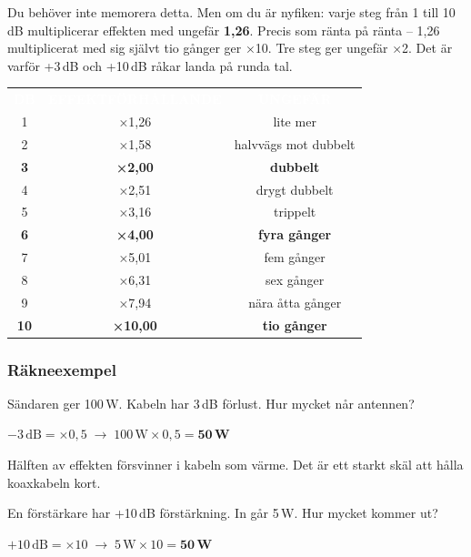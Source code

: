 \documentclass[a4paper,11pt,twoside]{book}
\newcommand{\emoji}[1]{{\emojifont #1}}
\newcommand{\tblhdr}[1]{\cellcolor{greydark}\textcolor{white}{\headingfont\bfseries\footnotesize\MakeUppercase{#1}}}
\begin{document}
\begin{examplebox}[title={\emoji{💡} Hela dB-tabellen -- för den nyfikne}]
Du behöver inte memorera detta. Men om du är nyfiken: varje steg från 1 till 10\,dB multiplicerar effekten med ungefär \textbf{1,26}. Precis som ränta på ränta -- 1,26 multiplicerat med sig självt tio gånger ger ×10. Tre steg ger ungefär ×2. Det är varför +3\,dB och +10\,dB råkar landa på runda tal.

\smallskip
\begin{center}
\begin{tabular}{ccc}
\rowcolor{greydark}
\tblhdr{dB} & \tblhdr{Effektförhållande} & \tblhdr{Ungefär} \\
1  & ×1,26 & lite mer \\
\rowcolor{greylight}
2  & ×1,58 & halvvägs mot dubbelt \\
\textbf{3}  & \textbf{×2,00} & \textbf{dubbelt} \\
\rowcolor{greylight}
4  & ×2,51 & drygt dubbelt \\
5  & ×3,16 & trippelt \\
\rowcolor{greylight}
\textbf{6}  & \textbf{×4,00} & \textbf{fyra gånger} \\
7  & ×5,01 & fem gånger \\
\rowcolor{greylight}
8  & ×6,31 & sex gånger \\
9  & ×7,94 & nära åtta gånger \\
\rowcolor{greylight}
\textbf{10} & \textbf{×10,00} & \textbf{tio gånger} \\
\end{tabular}
\end{center}
\end{examplebox}

\subsubsection*{Räkneexempel}

\begin{worked}[title={Räkneexempel 1.3.2-1 -- Kabelförlust}]
Sändaren ger 100\,W. Kabeln har 3\,dB förlust. Hur mycket når antennen?

$-3\,\text{dB} = \times 0{,}5 \;\rightarrow\; 100\,\text{W} \times 0{,}5 = \mathbf{50\,\text{W}}$

Hälften av effekten försvinner i kabeln som värme. Det är ett starkt skäl att hålla koaxkabeln kort.
\end{worked}

\begin{worked}[title={Räkneexempel 1.3.2-2 -- Förstärkare}]
En förstärkare har +10\,dB förstärkning. In går 5\,W. Hur mycket kommer ut?

$+10\,\text{dB} = \times 10 \;\rightarrow\; 5\,\text{W} \times 10 = \mathbf{50\,\text{W}}$
\end{worked}
\end{document}
